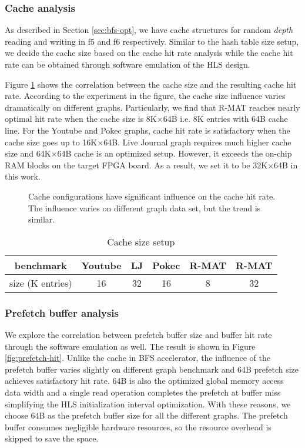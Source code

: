 \subsubsection{Cache analysis}
As described in Section \ref{sec:bfs-opt}, we have 
cache structures for random \textit{depth} reading 
and writing in f5 and f6 respectively. 
Similar to the hash table size setup, we decide the 
cache size based on the cache hit rate analysis while the cache 
hit rate can be obtained through software emulation of the HLS design. 

Figure \ref{fig:cache-hit} shows the correlation 
between the cache size and the resulting cache 
hit rate. According to the experiment in the figure,  
the cache size influence varies dramatically on different graphs. 
Particularly, we find that R-MAT\uppercase\expandafter{} 
reaches nearly optimal hit rate when the cache size is 8K$\times$64B i.e. 
8K entries with 64B cache line. For the Youtube and Pokec graphs, cache hit 
rate is satisfactory when the cache size goes up to 
16K$\times$64B. Live Journal graph requires much higher cache size and 
64K$\times$64B cache is an optimized setup. However, it exceeds the 
on-chip RAM blocks on the target FPGA board. As a result, we set it 
to be 32K$\times$64B in this work.

\begin{figure}
    \caption{Cache configurations have significant influence on the cache hit rate.
    The influence varies on different graph data set, but the trend is similar.}
\label{fig:cache-hit}
\end{figure}

\begin{table}
    \centering
  \caption{Cache size setup}
  \label{tab:hash-size}
  \begin{tabular}{cccccc}
    \toprule
      benchmark & Youtube & LJ & Pokec & R-MAT\uppercase\expandafter{\romannumeral1}
      & R-MAT\uppercase\expandafter{\romannumeral2} \\
    \midrule
      size (K entries) & 16 & 32 & 16 & 8 & 32 \\
  \bottomrule
\end{tabular}
\end{table}

\subsubsection{Prefetch buffer analysis}
We explore the correlation between prefetch buffer size and  
buffer hit rate through the software emulation as well. The result is 
shown in Figure \ref{fig:prefetch-hit}. Unlike the cache in BFS accelerator,  
the influence of the prefetch buffer varies slightly on different 
graph benchmark and 64B prefetch size achieves satisfactory 
hit rate. 64B is also the optimized global memory access data width 
and a single read operation completes the prefetch at buffer miss simplifying the 
HLS initialization interval optimization. With these reasons, 
we choose 64B as the prefetch buffer size for all the different graphs.
The prefetch buffer consumes negligible hardware resources, so the resource overhead 
is skipped to save the space.

